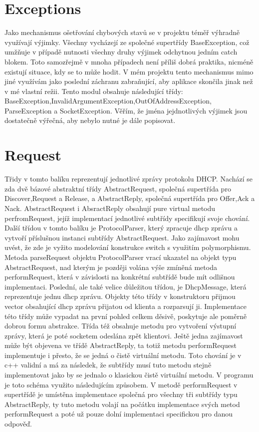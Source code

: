 \documentclass[12pt,a4paper]{report}
\begin{document}
\section*{Exceptions}
Jako mechanismus ošetřování chybových stavů se v projektu téměř výhradně využívají výjimky. Všechny vycházejí ze společné supertřídy BaseException, což umžňuje v případě nutnosti všechny druhy výjimek odchytnou jedním catch blokem. Toto samozřejmě v mnoha případech není příliš dobrá praktika, nicméně existují situace, kdy se to může hodit. V mém projektu tento mechanismus mimo jiné využívám jako poslední záchranu zabraňující, aby aplikace skončila jinak než v mé vlastní režii. 
Tento modul obsahuje následující třídy: BaseException,InvalidArgumentException,OutOfAddressException,\\ParseException a SocketException.
Věřím, že jména jejdnotlivých výjimek jsou dostatečně výřečná, aby nebylo nutné je dále popisovat. 
\section*{Request}
Třidy v tomto balíku reprezentují jednotlivé zprávy protokolu DHCP. Nachází se zda dvě bázové abstraktní třídy AbstractRequest, společná supertřída pro Discover,Request a Release, a AbstractReply, společná supertřída pro Offer,Ack a Nack. AbstractRequest i AbsractReply obsahují pure virtual metodu perfromRequest, jejíž implementací jednotlivé subtřídy specifikují svoje chování. Další třídou v tomto balíku je ProtocolParser, který zpracuje dhcp zprávu a vytvoří příslušnou instanci subtřídy AbstractRequest. Jako zajímavost mohu uvést, že zde je vyžito modelování konstrukce switch s využitím polymorphismu. Metoda parseRequest objektu ProtocolParser vrací ukazatel na objekt typu AbstractRequest, nad kterým je později volána výše zmíněná metoda performRequest, která v závislosti na konkrétní subtřídě bude mít odlišnou implementaci. Poslední, ale také velice důležitou třídou, je DhcpMessage, která reprezentuje jednu dhcp zprávu. Objekty této třídy v konstruktoru přijmou vector obsahující dhcp zprávu přijatou od klienta a rozparsují ji. Implementace této třídy může vypadat na první pohled celkem děsivě, poskytuje ale poměrně dobrou formu abstrakce. Třída též obsahuje metodu pro vytvoření výstupní zprávy, která je poté socketem odeslána zpět klientovi. Ještě jedna zajímavost může být objevena ve třídě AbstractReply, ta totiž metodu performRequest implementuje i přesto, že se jedná o čistě virtuální metodu. Toto chování je v c++ validní a má za následek, že subtřídy musí tuto metodu stejně implementovat jako by se jednalo o klasickou čistě virtuální metodu. V programu je toto schéma využito následujícím způsobem. V metodě performRequest v supertřídě je umístěna implementace společná pro všechny tři subtřídy typu AbstractReply, ty tuto metodu volají na počátku implementace svých metod performRequest a poté už pouze dolní implementaci specifickou pro danou odpověď.
\end{document}
